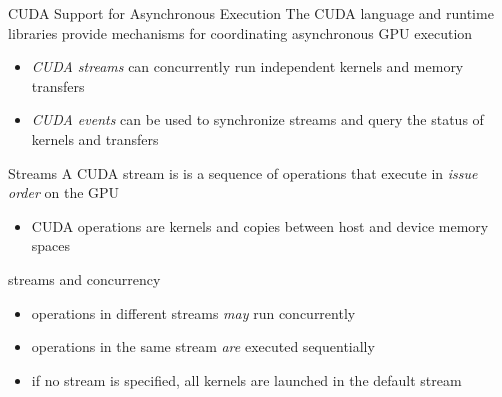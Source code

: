 \begin{frame}[fragile]{CUDA Support for Asynchronous Execution}
    The CUDA language and runtime libraries provide mechanisms for coordinating asynchronous GPU execution

    \begin{itemize}
        \item \emph{CUDA streams} can concurrently run independent kernels and memory transfers
        \item \emph{CUDA events} can be used to synchronize streams and query the status of kernels and transfers
    \end{itemize}

\end{frame}

\begin{frame}[fragile]{Streams}
    A CUDA stream is is a sequence of operations that execute in \emph{issue order} on the GPU
    \begin{itemize}
        \item CUDA operations are kernels and copies between host and device memory spaces
    \end{itemize}

    \begin{info}{streams and concurrency}
        \begin{itemize}
            \item operations in different streams \emph{may} run concurrently
            \item operations in the same stream \emph{are} executed sequentially
            \item if no stream is specified, all kernels are launched in the default stream
        \end{itemize}
    \end{info}

\end{frame}

